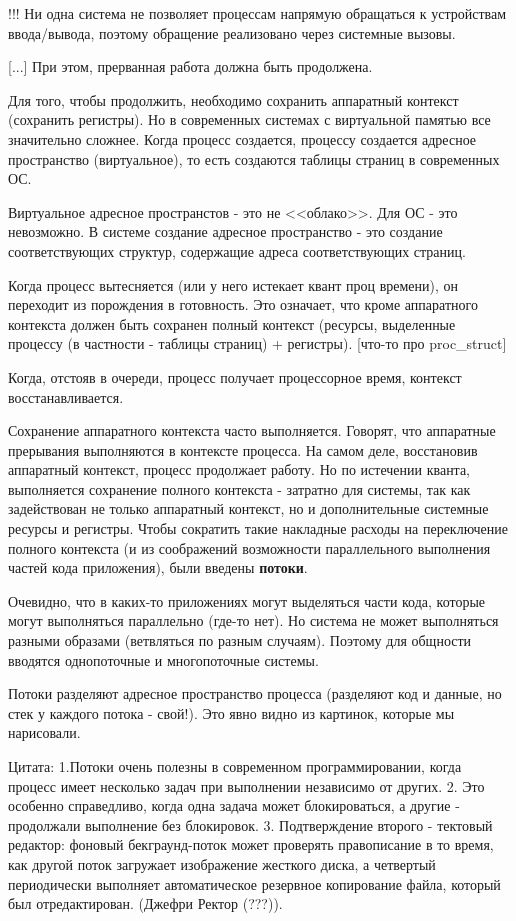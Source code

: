 \documentclass[a4paper, 12pt]{report}
\begin{document}
	!!! Ни одна система не позволяет процессам напрямую обращаться к устройствам ввода/вывода, поэтому обращение реализовано через системные вызовы.
	
	[...] При этом, прерванная работа должна быть продолжена.
	
	Для того, чтобы продолжить, необходимо сохранить аппаратный контекст (сохранить регистры). Но в современных системах с виртуальной памятью все значительно сложнее. Когда процесс создается, процессу создается адресное пространство (виртуальное), то есть создаются таблицы страниц в современных ОС.
	
	Виртуальное адресное пространстов - это не <<облако>>. Для ОС - это невозможно. В системе создание адресное пространство - это создание соответствующих структур, содержащие адреса соответствующих страниц.
	
	Когда процесс вытесняется (или у него истекает квант проц времени), он переходит из порождения в готовность. Это означает, что кроме аппаратного контекста должен быть сохранен полный контекст (ресурсы, выделенные процессу (в частности - таблицы страниц) + регистры). [что-то про proc\_struct]
	
	Когда, отстояв в очереди, процесс получает процессорное время, контекст восстанавливается.
	
	Сохранение аппаратного контекста часто выполняется. Говорят, что аппаратные прерывания выполняются в контексте процесса. На самом деле, восстановив аппаратный контекст, процесс продолжает работу. Но по истечении кванта, выполняется сохранение полного контекста - затратно для системы, так как задействован не только аппаратный контекст, но и дополнительные системные ресурсы и регистры. Чтобы сократить такие накладные расходы на переключение полного контекста (и из соображений возможности параллельного выполнения частей кода приложения), были введены {\bf потоки}.
	
	Очевидно, что в каких-то приложениях могут выделяться части кода, которые могут выполняться параллельно (где-то нет). Но система не может выполняться разными образами (ветвляться по разным случаям). Поэтому для общности вводятся однопоточные и многопоточные системы.
	
	Потоки разделяют адресное пространство процесса (разделяют код и данные, но стек у каждого потока - свой!). Это явно видно из картинок, которые мы нарисовали.
	
	Цитата: 1.Потоки очень полезны в современном программировании, когда процесс имеет несколько задач при выполнении независимо от других. 2. Это особенно справедливо, когда одна задача может блокироваться, а другие - продолжали выполнение без блокировок. 3. Подтверждение второго - тектовый редактор: фоновый бекграунд-поток может проверять правописание в то время, как другой поток загружает изображение жесткого диска, а четвертый периодически выполняет автоматическое резервное копирование файла, который был отредактирован. (Джефри Ректор (???)).
	
\end{document}
